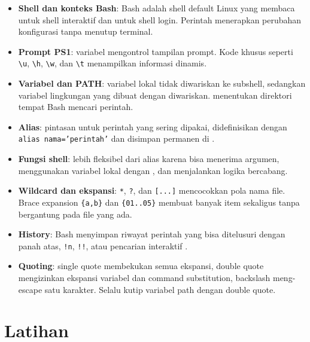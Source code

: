 \begin{itemize}[noitemsep,topsep=2pt]
    \item \textbf{Shell dan konteks Bash}: Bash adalah shell default Linux
          yang membaca  untuk shell interaktif dan
           untuk shell login. Perintah 
          menerapkan perubahan konfigurasi tanpa menutup terminal.
    \item \textbf{Prompt PS1}: variabel  mengontrol tampilan
          prompt. Kode khusus seperti \texttt{\textbackslash u},
          \texttt{\textbackslash h}, \texttt{\textbackslash w}, dan
          \texttt{\textbackslash t} menampilkan informasi dinamis.
    \item \textbf{Variabel dan PATH}: variabel lokal tidak diwariskan ke
          subshell, sedangkan variabel lingkungan yang dibuat dengan
           diwariskan.  menentukan direktori tempat
          Bash mencari perintah.
    \item \textbf{Alias}: pintasan untuk perintah yang sering dipakai,
          didefinisikan dengan \texttt{alias nama='perintah'} dan
          disimpan permanen di .
    \item \textbf{Fungsi shell}: lebih fleksibel dari alias karena bisa
          menerima argumen, menggunakan variabel lokal dengan ,
          dan menjalankan logika bercabang.
    \item \textbf{Wildcard dan ekspansi}: \texttt{*}, \texttt{?}, dan
          \texttt{[...]} mencocokkan pola nama file. Brace expansion
          \texttt{\{a,b\}} dan \texttt{\{01..05\}} membuat banyak item
          sekaligus tanpa bergantung pada file yang ada.
    \item \textbf{History}: Bash menyimpan riwayat perintah yang bisa
          ditelusuri dengan panah atas, \texttt{!n}, \texttt{!!}, atau
          pencarian interaktif .
    \item \textbf{Quoting}: single quote membekukan semua ekspansi, double
          quote mengizinkan ekspansi variabel dan command substitution,
          backslash meng-escape satu karakter. Selalu kutip variabel path
          dengan double quote.
\end{itemize}

\section{Latihan}
\label{sec:latihan-bash-shell}

